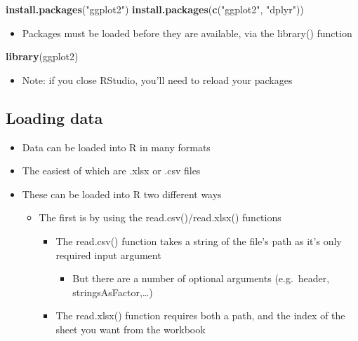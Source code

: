 \documentclass[]{article}
\newenvironment{Shaded}{\begin{snugshade}}{\end{snugshade}}
\newcommand{\KeywordTok}[1]{\textcolor[rgb]{0.13,0.29,0.53}{\textbf{#1}}}
\newcommand{\StringTok}[1]{\textcolor[rgb]{0.31,0.60,0.02}{#1}}
\newcommand{\NormalTok}[1]{#1}
\providecommand{\tightlist}{%
  \setlength{\itemsep}{0pt}\setlength{\parskip}{0pt}}
\begin{document}
\begin{Shaded}
\begin{Highlighting}[]
\KeywordTok{install.packages}\NormalTok{(}\StringTok{"ggplot2"}\NormalTok{)}
\KeywordTok{install.packages}\NormalTok{(}\KeywordTok{c}\NormalTok{(}\StringTok{"ggplot2"}\NormalTok{, }\StringTok{"dplyr"}\NormalTok{))}
\end{Highlighting}
\end{Shaded}

\begin{itemize}
\tightlist
\item
  Packages must be loaded before they are available, via the library()
  function
\end{itemize}

\begin{Shaded}
\begin{Highlighting}[]
\KeywordTok{library}\NormalTok{(ggplot2)}
\end{Highlighting}
\end{Shaded}

\begin{itemize}
\tightlist
\item
  Note: if you close RStudio, you'll need to reload your packages
\end{itemize}

\subsection{Loading data}\label{loading-data}

\begin{itemize}
\tightlist
\item
  Data can be loaded into R in many formats
\item
  The easiest of which are .xlsx or .csv files
\item
  These can be loaded into R two different ways

  \begin{itemize}
  \tightlist
  \item
    The first is by using the read.csv()/read.xlsx() functions

    \begin{itemize}
    \tightlist
    \item
      The read.csv() function takes a string of the file's path as it's
      only required input argument

      \begin{itemize}
      \tightlist
      \item
        But there are a number of optional arguments (e.g.~header,
        stringsAsFactor,\ldots{})
      \end{itemize}
    \item
      The read.xlsx() function requires both a path, and the index of
      the sheet you want from the workbook
    \end{itemize}
  \end{itemize}
\end{itemize}
\end{document}
